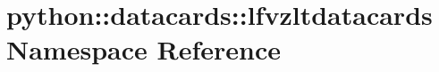 \hypertarget{namespacepython_1_1datacards_1_1lfvzltdatacards}{
\section{python::datacards::lfvzltdatacards Namespace Reference}
\label{namespacepython_1_1datacards_1_1lfvzltdatacards}
}
